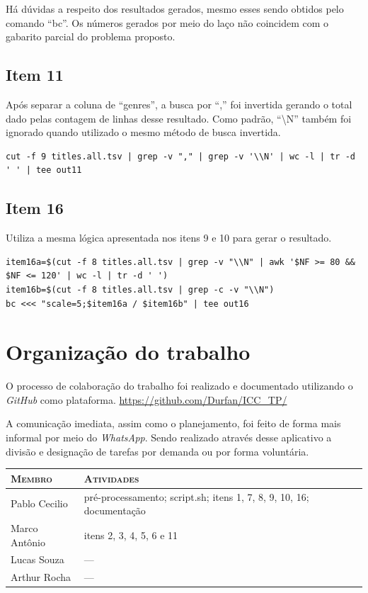 \documentclass[12pt]{article}
\begin{document}
Há dúvidas a respeito dos resultados gerados, mesmo esses sendo obtidos pelo comando ``bc''. Os números gerados por meio do laço não coincidem com o gabarito parcial do problema proposto.

\subsection*{Item 11}

Após separar a coluna de ``genres'', a busca por  ``,''  foi invertida gerando o total dado pelas contagem de linhas desse resultado. Como padrão, ``\textbackslash N'' também foi ignorado quando utilizado o mesmo método de busca invertida.

\begin{verbatim}
cut -f 9 titles.all.tsv | grep -v "," | grep -v '\\N' | wc -l | tr -d ' ' | tee out11
\end{verbatim}

\subsection*{Item 16}

Utiliza a mesma lógica apresentada nos itens 9 e 10 para gerar o resultado.

\begin{verbatim}
item16a=$(cut -f 8 titles.all.tsv | grep -v "\\N" | awk '$NF >= 80 && $NF <= 120' | wc -l | tr -d ' ')
item16b=$(cut -f 8 titles.all.tsv | grep -c -v "\\N")
bc <<< "scale=5;$item16a / $item16b" | tee out16
\end{verbatim}

\section{Organização do trabalho}

O processo de colaboração do trabalho foi realizado e documentado utilizando o \textit{GitHub} como plataforma. \url{https://github.com/Durfan/ICC_TP/}

A comunicação imediata, assim como o planejamento, foi feito de forma mais informal por meio do \textit{WhatsApp}. Sendo realizado através desse aplicativo a divisão e designação de tarefas por demanda ou por forma voluntária.

\begin{table}[!h]
    \begin{tabular}{p{5cm}p{7.5cm}}
    
        \textsc{Membro}      & \textsc{Atividades} \\ 
	    \hline
        Pablo Cecilio & pré-processamento; script.sh; itens 1, 7, 8, 9, 10, 16; documentação \\ 
        Marco Antônio & itens 2, 3, 4, 5, 6 e 11 \\
        Lucas Souza & --- \\
        Arthur Rocha & --- \\

    \end{tabular}
\end{table}
\end{document}
